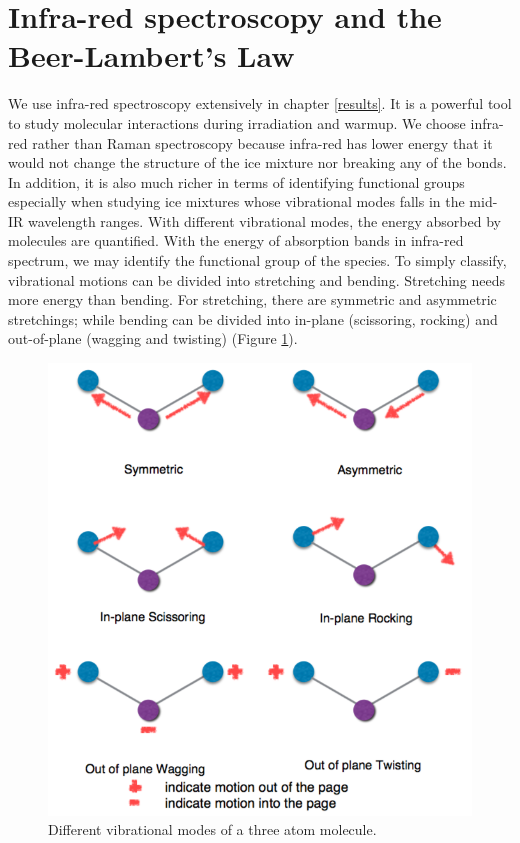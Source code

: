 \section{Infra-red spectroscopy and the Beer-Lambert’s Law}
\label{sec:spectroscopy}
We use infra-red spectroscopy extensively in chapter \ref{results}. It is a powerful tool to study molecular interactions during irradiation and warmup. We choose infra-red rather than Raman spectroscopy because infra-red has lower energy that it would not change the structure of the ice mixture nor breaking any of the bonds. In addition, it is also much richer in terms of identifying functional groups especially when studying ice mixtures whose vibrational modes falls in the mid-IR wavelength ranges. With different vibrational modes, the energy absorbed by molecules are quantified. With the energy of absorption bands in infra-red spectrum, we may identify the functional group of the species. To simply classify, vibrational motions can be divided into stretching and bending. Stretching needs more energy than bending. For stretching, there are symmetric and asymmetric stretchings; while bending can be divided into in-plane (scissoring, rocking) and out-of-plane (wagging and twisting) (Figure \ref{fig:vibration}).
\begin{figure}
\centering
\includegraphics[width=\textwidth]{figures/chapter2/vibration.png}
\caption{Different vibrational modes of a three atom molecule.}
\label{fig:vibration}
\end{figure}

